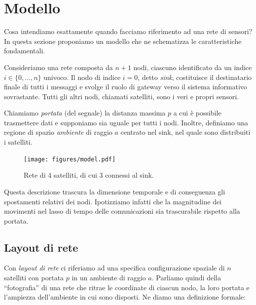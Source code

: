 \documentclass[a4paper,12pt]{article}
\theoremstyle{definition}
\begin{document}
\section{Modello}

Cosa intendiamo esattamente quando facciamo riferimento ad una rete di sensori? In questa sezione proponiamo un modello che ne schematizza le caratteristiche fondamentali.



Consideriamo una rete composta da $n+1$ nodi, ciascuno identificato da un indice $i \in \{0, \dots, n\}$ univoco. Il nodo di indice $i=0$, detto \emph{sink}, costituisce il destinatario finale di tutti i messaggi e svolge il ruolo di gateway verso il sistema informativo sovrastante. Tutti gli altri nodi, chiamati satelliti, sono i veri e propri sensori.

Chiamiamo \emph{portata} (del segnale) la distanza massima $p$ a cui è possibile trasmettere dati e supponiamo sia uguale per tutti i nodi. Inoltre, definiamo una regione di spazio \emph{ambiente} di raggio $a$ centrato nel sink, nel quale sono distribuiti i satelliti.

\begin{figure}[H]
\centering
\texttt{[image: figures/model.pdf]}
\caption{Rete di 4 satelliti, di cui 3 connessi al sink.}
\end{figure}

Questa descrizione trascura la dimensione temporale e di conseguenza gli spostamenti relativi dei nodi. Ipotizziamo infatti che la magnitudine dei movimenti nel lasso di tempo delle comunicazioni sia trascurabile rispetto alla portata.

\subsection{Layout di rete}

Con \emph{layout di rete} ci riferiamo ad una specifica configurazione spaziale di $n$ satelliti con portata $p$ in un ambiente di raggio $a$. Parliamo quindi della ``fotografia'' di una rete che ritrae le coordinate di ciascun nodo, la loro portata e l'ampiezza dell'ambiente in cui sono disposti. Ne diamo una definizione formale:
\end{document}
